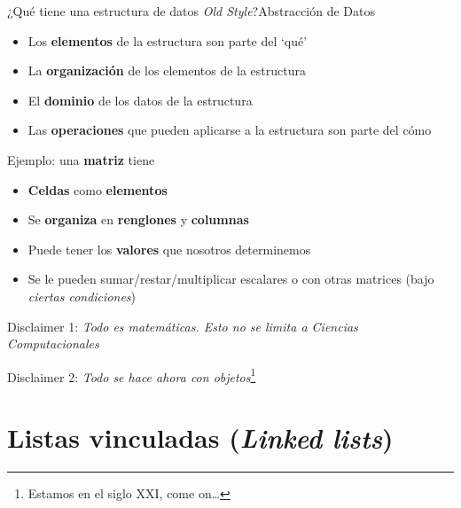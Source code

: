 \documentclass[spanish, c]{beamer}
\begin{document}
\begin{frame}{¿Qué tiene una estructura de datos \textit{Old Style}?}{Abstracción de Datos}

    \begin{itemize}
        \item Los {\color{red} \textbf{elementos}} de la estructura son parte del {\color{red} `qué'} \pause
        \item La {\color{red} \textbf{organización}} de los elementos de la estructura\pause
        \item El {\color{red} \textbf{dominio}} de los datos de la estructura \pause
        \item Las {\color{blue} \textbf{operaciones}} que pueden aplicarse a la estructura son parte del {\color{blue} cómo} \pause
    \end{itemize}

    \bigskip

    Ejemplo: una \textbf{matriz} tiene

    \begin{itemize}
        \item \textbf{Celdas} como {\color{red} \textbf{elementos}} \pause
        \item Se {\color{red} \textbf{organiza}} en \textbf{renglones} y \textbf{columnas} \pause
        \item Puede tener los {\color{red} \textbf{valores}} que nosotros determinemos \pause
        \item Se le pueden {\color{blue} sumar/restar/multiplicar} escalares o con otras matrices (bajo \textit{ciertas condiciones})
    \end{itemize}
\end{frame}

\begin{frame}[plain]
    \begin{center}
        \Huge
        Disclaimer 1: \textit{Todo es matemáticas. Esto no se limita a Ciencias Computacionales}

        \bigskip

        Disclaimer 2: \textit{Todo se hace ahora con objetos}\footnote{Estamos en el siglo XXI, come on\dots}
    \end{center}
\end{frame}

\section{Listas vinculadas (\textit{Linked lists})}
\end{document}
